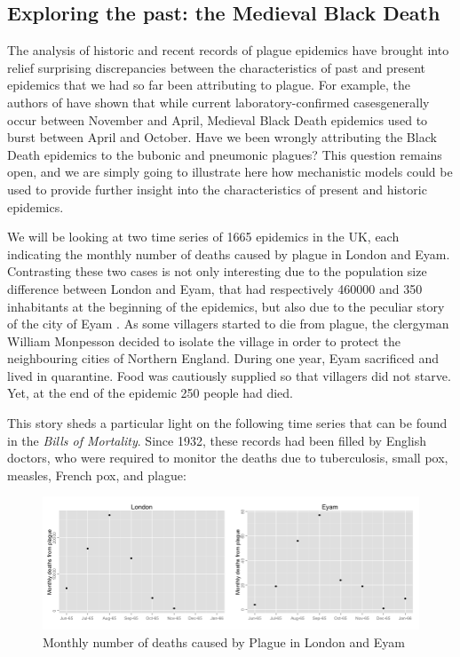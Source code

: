 \documentclass[a4paper,11pt,titlepage]{article}
\theoremstyle{plain} %
\begin{document}
\subsection{Exploring the past: the Medieval Black Death}


The analysis of historic and recent records of plague epidemics have brought into relief 
surprising discrepancies between the characteristics of past and present epidemics that we had so far been attributing to plague. For example, the authors of \cite{Welford2009} have shown that while current laboratory-confirmed casesgenerally occur between November and April, Medieval Black Death epidemics used to burst between April and October. Have we been wrongly attributing the Black Death epidemics to the bubonic and pneumonic plagues? This question remains open, and we are simply going to illustrate here how mechanistic models could be used to provide further insight into the characteristics of present and historic epidemics. 


We will be looking at two time series of 1665 epidemics in the UK, each indicating the monthly number of deaths
caused by plague in London and Eyam. Contrasting these two cases is not only interesting due to the population size difference between London  and Eyam, that had respectively 460000 and 350 inhabitants at the beginning of the epidemics, but also due to the peculiar story of the city of Eyam \cite{Race1995}. As some villagers started to die from plague, the clergyman William Monpesson decided to isolate the village in order to protect the neighbouring cities of Northern  England. During one year, Eyam sacrificed and lived in quarantine. Food was cautiously supplied so that villagers did not starve. Yet, at the end of the epidemic 250 people had died. 


This story sheds a particular light on the following time series that can be found in the \emph{Bills of Mortality}.  Since 1932, these records had been filled by English doctors, who were required to monitor the deaths due to tuberculosis, small pox, measles, French pox, and plague:

\begin{figure}[h]
\begin{centering}
\includegraphics[scale=0.5]{Plague_data.png}
\par\end{centering}

\caption{\label{fig:What-could-habe}Monthly number of deaths caused by Plague in London and Eyam}
\end{figure}
\end{document}
